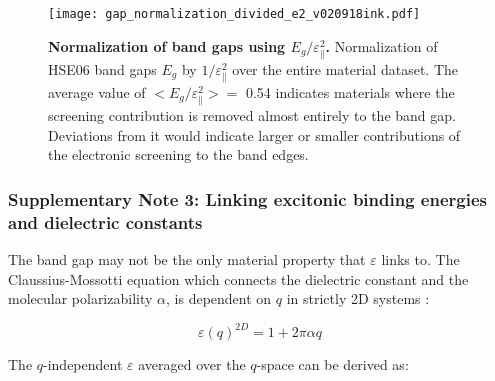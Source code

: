 \documentclass[journal=ancac3,manuscript=article,email=true,hyperref=true,keywords=true]{achemso}
\begin{document}
\begin{figure}[H]
\centering
\texttt{[image: gap\_normalization\_divided\_e2\_v020918ink.pdf]}
\caption{\label{fig-S5}
{\bf Normalization of band gaps using $E_g/\varepsilon_{\parallel}^2$.} Normalization of HSE06 band gaps $E_g$ by $1/\varepsilon_{\parallel}^{2}$ over the entire material 
dataset. The average value of $<E_{g}/\varepsilon_{\parallel}^{2}>=$ 0.54 indicates materials where  
the screening contribution is removed almost entirely to the band gap. Deviations from it would indicate 
larger or smaller contributions of the electronic screening to the band edges. 
}
\end{figure}



\subsubsection{Supplementary Note 3: Linking excitonic binding energies and dielectric constants}

The band gap may not be the only material property that \(\varepsilon\)
links to. The Claussius-Mossotti equation which
connects the dielectric constant and the molecular polarizability \(\alpha\), is
dependent on \(q\) in strictly 2D systems
\cite{Cudazzo_2011_screening_2D}:

\begin{equation}
\label{eq:Claussius-Mossotti-2D}
\varepsilon(q)^{2D} = 1 + 2\pi \alpha q
\end{equation}

The \(q\)-independent \(\varepsilon\) averaged over the \(q\)-space 
can be derived as\cite{Olsen_2016_hydrogen}:
\end{document}
